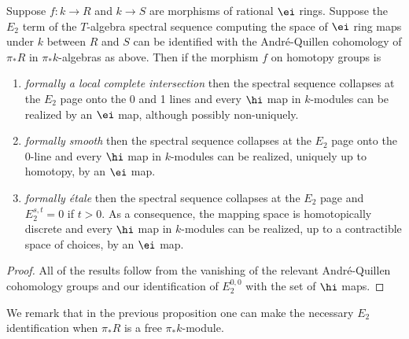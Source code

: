 \documentclass[leqno,oneside,english]{elsarticle}
\begin{document}
\begin{prop}\label{prop:vanishing-conditions}
  Suppose $f\colon k\rightarrow R$ and $k\rightarrow S$ are morphisms of
  rational $\ei$ rings. Suppose the $E_2$ term of the $T$-algebra spectral sequence
 computing the space of $\ei$ ring maps under $k$ between $R$ and
  $S$ can be identified with the Andr\'e-Quillen cohomology of $\pi_*R$ in $\pi_*k$-algebras as above. Then if the morphism $f$ on homotopy groups is
  \begin{enumerate}
  \item \emph{formally a local complete intersection} then the spectral sequence
    collapses at the $E_2$ page onto the 0 and 1 lines and every $\hi$
    map in $k$-modules can be realized by an $\ei$ map, although possibly non-uniquely.
  \item \emph{formally smooth} then the spectral sequence
    collapses at the $E_2$ page onto the 0-line and every $\hi$ map in $k$-modules can
    be realized,  uniquely up to homotopy, by an $\ei$ map.
  \item \emph{formally \'etale} then the spectral sequence
    collapses at the $E_2$ page and $E_2^{s,t}=0$ if $t>0$. As a
    consequence, the mapping space is homotopically discrete and every
    $\hi$ map in $k$-modules can be realized, up to a contractible space of choices, by
    an $\ei$ map.
  \end{enumerate}
\end{prop}
\begin{proof}
  All of the results follow from the vanishing of the relevant
  Andr\'e-Quillen cohomology groups \cite[Thm.~2.4
    (\textit{ii})]{Qui70} and our identification of $E_2^{0,0}$ with
  the set of $\hi$ maps.
\end{proof}

We remark that in the previous proposition one can make the necessary $E_2$ identification when $\pi_*R$ is a free $\pi_*k$-module.
{{\ifshowsaveblocks
{}
\fi}}{}
\end{document}
